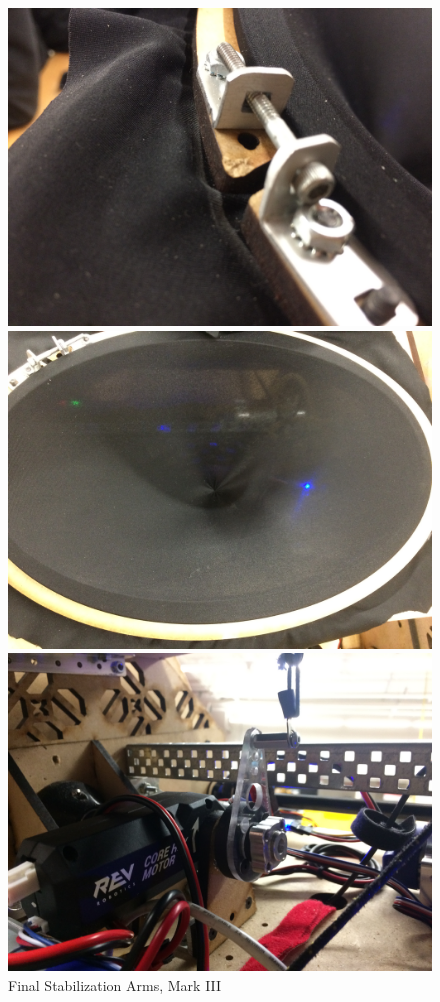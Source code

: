 \begin{figure}[htp]
\centering
\begin{minipage}{.32\textwidth}
  \centering
  \includegraphics[width= .9\linewidth]{Design_Overview/Shooter_Left.JPG}
\end{minipage}%
\hfill
\begin{minipage}{.32\textwidth}
  \centering
  \includegraphics[width= .9\linewidth]{Design_Overview/Shooter_Front.JPG}
  \caption{Final Stabilization Arms, Mark III}
  \label{fig:Triple_Arm_IMG}
\end{minipage}%
  \hfill
\begin{minipage}{.32\textwidth}
  \centering
  \includegraphics[width= .9\linewidth, angle=180]{Design_Overview/Shooter_Right.JPG}

\end{minipage}
\end{figure}
